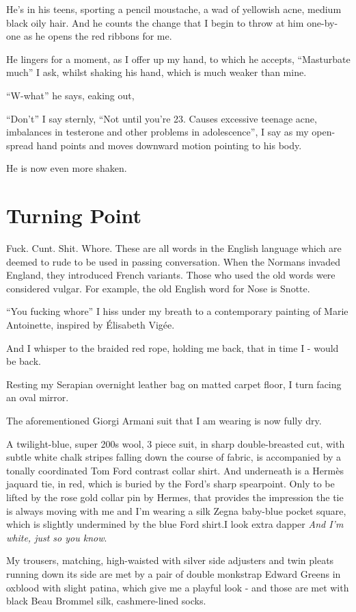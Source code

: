 \documentclass[19pt,openany]{book}
\begin{document}
He's in his teens, sporting
a pencil moustache, a wad of yellowish acne,
medium black oily hair.
And he counts the change that I begin
to throw at him one-by-one as
he opens the red ribbons for me.

He lingers for a moment,
as I offer up my hand, to which he accepts,
``Masturbate much''
I ask, whilst shaking his hand, which
is much weaker than mine.

``W-what'' he says, eaking out,

``Don't'' I say sternly,
``Not until you're 23. Causes excessive teenage acne,
imbalances in testerone and other problems
in adolescence'', I say as
my open-spread hand points and moves
downward motion pointing
to his body.

He is now even more shaken.

\chapter*{Turning Point}

Fuck. Cunt. Shit. Whore. These
are all words in the English language
which are deemed to rude to be
used in passing conversation.
When the Normans invaded England, they introduced French variants. Those who used the old words were considered vulgar.
For example, the old English word for Nose is Snotte.

``You fucking whore'' I hiss under my
breath to a contemporary
painting of Marie Antoinette,
inspired by Élisabeth Vigée.

And I whisper to the braided red rope, holding
me back, that in time
I - would be back.

Resting my Serapian overnight
leather bag on matted carpet floor, I
turn facing an oval mirror.

The aforementioned Giorgi
Armani suit that I am wearing
is now fully dry.

A twilight-blue, super 200s wool, 3 piece suit,
in sharp double-breasted cut, with subtle white chalk stripes
falling down the course of fabric, is accompanied by a tonally coordinated Tom Ford
contrast collar shirt. And underneath is a Hermès jaquard tie, in red,
which is buried by the Ford's sharp spearpoint. Only to be lifted by the rose gold
collar pin by Hermes, that provides the impression the tie is
always moving with me and
I'm wearing a silk Zegna baby-blue pocket square, which is slightly
undermined by the blue Ford shirt.I look extra dapper
\textit{And
I'm white, just so you know}.

My trousers, matching, high-waisted
with silver side adjusters
and twin pleats running down its side
are met by a pair of double monkstrap
Edward Greens in oxblood
with slight patina, which give
me a playful look - and those
are met with black Beau Brommel silk, cashmere-lined
socks.
\end{document}
